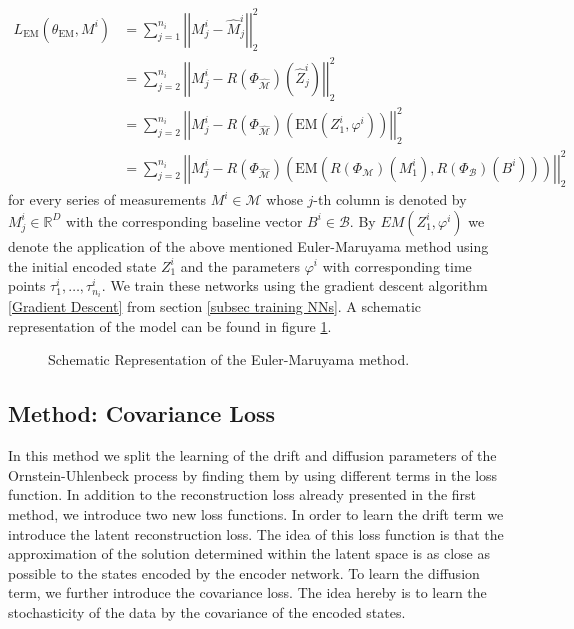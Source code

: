 \documentclass[11pt,titlepage]{article}
\newcommand{\R}{\mathbb{R}} %
\newcommand{\abs}[1]{{\left| #1 \right|}}
\theoremstyle{definition}
\theoremstyle{remark}
\begin{document}
	\begin{align*}
		L_{\mathrm{EM}}(\theta_\mathrm{EM}, M^i) &= \sum_{j=1}^{n_i} \abs{\abs{M^i_j- \hat{M}^i_j}}_2^2\\
		&= \sum_{j=2}^{n_i} \abs{\abs{M^i_j- R(\Phi_{\hat{\mathcal{M}}})(\hat{Z}^i_j)}}_2^2\\
		&= \sum_{j=2}^{n_i} \abs{\abs{M^i_j- R(\Phi_{\hat{\mathcal{M}}})(\mathrm{EM}(Z^i_1, \varphi^i))}}_2^2\\
		&= \sum_{j=2}^{n_i} \abs{\abs{M^i_j- R(\Phi_{\hat{\mathcal{M}}})(\mathrm{EM}(R(\Phi_\mathcal{M})(M^i_1), R(\Phi_\mathcal{B})(B^i)))}}_2^2
	\end{align*}
	for every series of measurements $M^i\in \mathcal{M}$ whose $j$-th column is denoted by $M^i_j\in\R^D$ with the corresponding baseline vector $B^i\in\mathcal{B}$. By $EM(Z^i_1, \varphi^i)$ we denote the application of the above mentioned Euler-Maruyama method using the initial encoded state $Z^i_1$ and the parameters $\varphi^i$ with corresponding time points $\tau^i_1, \ldots,\tau^i_{n_i}$.
	We train these networks using the gradient descent algorithm \ref{Gradient Descent} from section \ref{subsec training NNs}. 
	A schematic representation of the model can be found in figure \ref{Abb Euler Mar method}.
	
	
	\begin{figure}[!h]
		\caption{Schematic Representation of the Euler-Maruyama method.}
		\label{Abb Euler Mar method}
	\end{figure}
	
	\subsection{Method: Covariance Loss}\label{sec cov loss}
	
	In this method we split the learning of the drift and diffusion parameters of the Ornstein-Uhlenbeck process by finding them by using different terms in the loss function. In addition to the reconstruction loss already presented in the first method, we introduce two new loss functions. In order to learn the drift term we introduce the latent reconstruction loss. The idea of this loss function is that the approximation of the solution determined within the latent space is as close as possible to the states encoded by the encoder network. To learn the diffusion term, we further introduce the covariance loss. The idea hereby is to learn the stochasticity of the data by the covariance of the encoded states.\\
\end{document}
